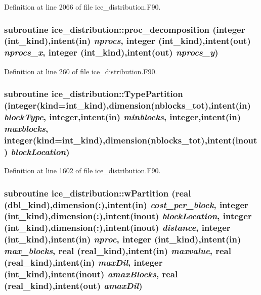 Definition at line 2066 of file ice\_\-distribution.F90.\hypertarget{namespaceice__distribution_a53b1d1fb3c8ddf978561163a12c8b1a4}{
\subsubsection[{proc\_\-decomposition}]{\setlength{\rightskip}{0pt plus 5cm}subroutine ice\_\-distribution::proc\_\-decomposition (integer (int\_\-kind),intent(in) {\em nprocs}, \/  integer (int\_\-kind),intent(out) {\em nprocs\_\-x}, \/  integer (int\_\-kind),intent(out) {\em nprocs\_\-y})}}
\label{namespaceice__distribution_a53b1d1fb3c8ddf978561163a12c8b1a4}


Definition at line 260 of file ice\_\-distribution.F90.\hypertarget{namespaceice__distribution_a9dcac951f0df38305378d4edc49b40ae}{
\subsubsection[{TypePartition}]{\setlength{\rightskip}{0pt plus 5cm}subroutine ice\_\-distribution::TypePartition (integer(kind=int\_\-kind),dimension(nblocks\_\-tot),intent(in) {\em blockType}, \/  integer,intent(in) {\em minblocks}, \/  integer,intent(in) {\em maxblocks}, \/  integer(kind=int\_\-kind),dimension(nblocks\_\-tot),intent(inout) {\em blockLocation})}}
\label{namespaceice__distribution_a9dcac951f0df38305378d4edc49b40ae}


Definition at line 1602 of file ice\_\-distribution.F90.\hypertarget{namespaceice__distribution_a209b009c99baf5ef254c40774baeaccc}{
\subsubsection[{wPartition}]{\setlength{\rightskip}{0pt plus 5cm}subroutine ice\_\-distribution::wPartition (real (dbl\_\-kind),dimension(:),intent(in) {\em cost\_\-per\_\-block}, \/  integer (int\_\-kind),dimension(:),intent(inout) {\em blockLocation}, \/  integer (int\_\-kind),dimension(:),intent(inout) {\em distance}, \/  integer (int\_\-kind),intent(in) {\em nproc}, \/  integer (int\_\-kind),intent(in) {\em max\_\-blocks}, \/  real (real\_\-kind),intent(in) {\em maxvalue}, \/  real (real\_\-kind),intent(in) {\em maxDil}, \/  integer (int\_\-kind),intent(inout) {\em amaxBlocks}, \/  real (real\_\-kind),intent(out) {\em amaxDil})}}
\label{namespaceice__distribution_a209b009c99baf5ef254c40774baeaccc}


